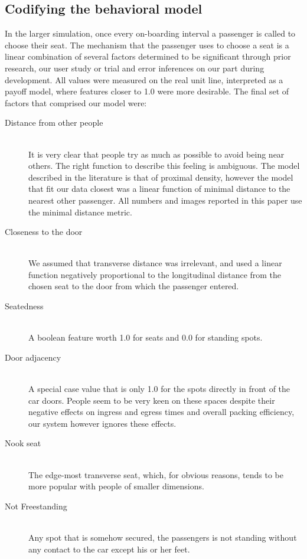 \documentclass{acm_proc_article-sp}
\begin{document}
\subsection{Codifying the behavioral model}
In the larger simulation, once every on-boarding interval a passenger is called to choose their seat. The mechanism that the passenger uses to choose a seat is a linear combination of several factors determined to be significant through prior research\cite{evans2007crowding, hai1982sex, maines1979ecological}, our user study or trial and error inferences on our part during development. All values were measured on the real unit line, interpreted as a payoff model, where features closer to 1.0 were more desirable. The final set of factors that comprised our model were:

\begin{description}
  \item[Distance from other people] \hfill \\
  It is very clear that people try as much as possible to avoid being near others. The right function to describe this feeling is ambiguous. The model described in the literature is that of proximal density\cite{evans2007crowding}, however the model that fit our data closest was a linear function of minimal distance to the nearest other passenger. All numbers and images reported in this paper use the minimal distance metric.
  \item[Closeness to the door] \hfill \\
  We assumed that transverse distance was irrelevant, and used a linear function negatively proportional to the longitudinal distance from the chosen seat to the door from which the passenger entered.
  \item[Seatedness] \hfill \\
  A boolean feature worth 1.0 for seats and 0.0 for standing spots.
  \item[Door adjacency] \hfill \\
  A special case value that is only 1.0 for the spots directly in front of the car doors. People seem to be very keen on these spaces despite their negative effects on ingress and egress times and overall packing efficiency, our system however ignores these effects.
  \item[Nook seat] \hfill \\
  The edge-most transverse seat, which, for obvious reasons, tends to be more popular with people of smaller dimensions.
  \item[Not Freestanding] \hfill \\
  Any spot that is somehow secured, the passengers is not standing without any contact to the car except his or her feet.
\end{description}
\end{document}
